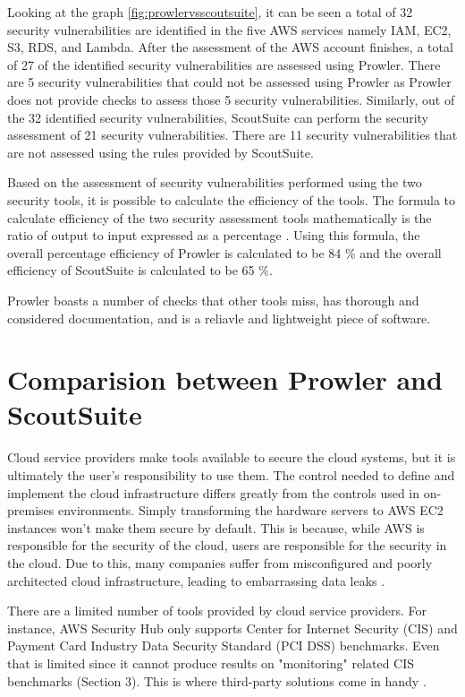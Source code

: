 \par Looking at the graph \ref{fig:prowlervsscoutsuite}, it can be seen a total of 32 security vulnerabilities are identified in the five AWS services namely IAM, EC2, S3, RDS, and Lambda. After the assessment of the AWS account finishes, a total of 27 of the identified security vulnerabilities are assessed using Prowler. There are 5 security vulnerabilities that could not be assessed using Prowler as Prowler does not provide checks to assess those 5 security vulnerabilities. Similarly, out of the 32 identified security vulnerabilities, ScoutSuite can perform the security assessment of 21 security vulnerabilities. There are 11 security vulnerabilities that are not assessed using the rules provided by ScoutSuite.

\par Based on the assessment of security vulnerabilities performed using the two security tools, it is possible to calculate the efficiency of the tools. The formula to calculate efficiency of the two security assessment tools mathematically is the ratio of output to input expressed as a percentage \cite{88}. Using this formula, the overall percentage efficiency of Prowler is calculated to be 84 \% and the overall efficiency of ScoutSuite is calculated to be 65 \%.

\par Prowler boasts a number of checks that other tools miss, has thorough and considered documentation, and is a reliavle and lightweight piece of software.

\section{Comparision between Prowler and ScoutSuite}

\par Cloud service providers make tools available to secure the cloud systems, but it is ultimately the user’s responsibility to use them.
The control needed to define and implement the cloud infrastructure differs greatly from the controls used in on-premises environments.
Simply transforming the hardware servers to AWS EC2 instances won't make them secure by default.
This is because, while AWS is responsible for the security of the cloud, users are responsible for the security in the cloud.
Due to this, many companies suffer from misconfigured and poorly architected cloud infrastructure, leading to embarrassing data leaks \cite{74}.

\par There are a limited number of tools provided by cloud service providers.
For instance, AWS Security Hub only supports Center for Internet Security (CIS) and Payment Card Industry Data
Security Standard (PCI DSS) benchmarks.
Even that is limited since it cannot produce results on "monitoring" related CIS benchmarks (Section 3).
This is where third-party solutions come in handy \cite{74}.

